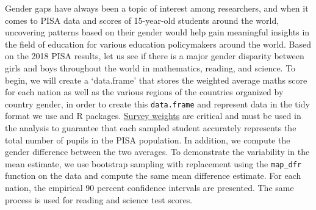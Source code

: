 Gender gaps have always been a topic of interest among researchers, and
when it comes to PISA data and scores of 15-year-old students around the
world, uncovering patterns based on their gender would help gain
meaningful insights in the field of education for various education
policymakers around the world. Based on the 2018 PISA results, let us
see if there is a major gender disparity between girls and boys
throughout the world in mathematics, reading, and science. To begin, we
will create a `data.frame' that stores the weighted average maths score
for each nation as well as the various regions of the countries
organized by country gender, in order to create this \texttt{data.frame}
and represent data in the tidy format we use 
\citep{tidyverse} and  \citep{dplyr} R packages.
\href{https://www.oecd.org/pisa/data/2015-technical-report/PISA-2015-Technical-Report-Chapter-8-Survey-Weighting.pdf}{Survey
weights} are critical and must be used in the analysis to guarantee that
each sampled student accurately represents the total number of pupils in
the PISA population. In addition, we compute the gender difference
between the two averages. To demonstrate the variability in the mean
estimate, we use bootstrap sampling with replacement using the
\texttt{map\_dfr} function on the data and compute the same mean
difference estimate. For each nation, the empirical 90 percent
confidence intervals are presented. The same process is used for reading
and science test scores.

